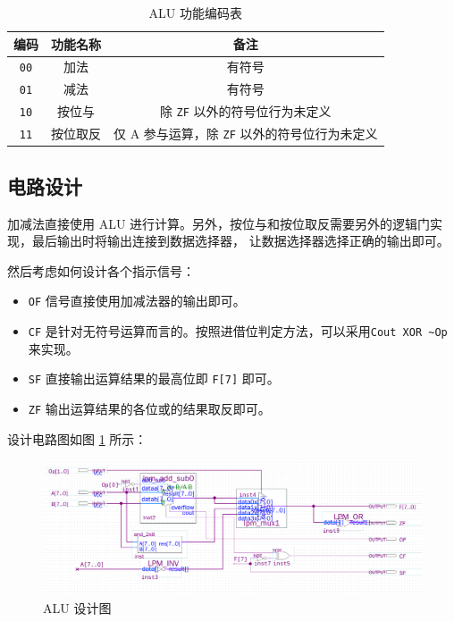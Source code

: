 \begin{table}[h]
    \centering
    \caption{ALU 功能编码表}
    \label{table:2-func_code}
    \begin{tabular}{|c|c|c|}
        \hline
        编码 & 功能名称 & 备注 \\ \hline
        \verb|00| & 加法 & 有符号 \\ \hline
        \verb|01| & 减法 & 有符号 \\ \hline
        \verb|10| & 按位与 & 除 \verb|ZF| 以外的符号位行为未定义 \\ \hline
        \verb|11| & 按位取反 & 仅 A 参与运算，除 \verb|ZF| 以外的符号位行为未定义 \\ \hline
    \end{tabular}
\end{table}

\subsection{电路设计}

加减法直接使用 ALU 进行计算。另外，按位与和按位取反需要另外的逻辑门实现，最后输出时将输出连接到数据选择器，
让数据选择器选择正确的输出即可。

然后考虑如何设计各个指示信号：

\begin{itemize}
    \item \verb|OF| 信号直接使用加减法器的输出即可。
    \item \verb|CF| 是针对无符号运算而言的。按照进借位判定方法，可以采用\verb|Cout XOR ~Op| 来实现。
    \item \verb|SF| 直接输出运算结果的最高位即 \verb|F[7]| 即可。
    \item \verb|ZF| 输出运算结果的各位或的结果取反即可。
\end{itemize}

设计电路图如图 \ref{figure:2-design} 所示：

\begin{figure}[h]
    \centering
    \caption{ALU 设计图}
    \label{figure:2-design}
    \includegraphics[scale=0.2]{pics/2-design.png}
\end{figure}

